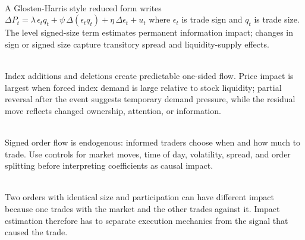 \begin{model} \\
A Glosten-Harris style reduced form writes $\Delta P_t=\lambda\,\epsilon_t q_t+\psi\,\Delta(\epsilon_t q_t)+\eta\,\Delta\epsilon_t+u_t$ where $\epsilon_t$ is trade sign and $q_t$ is trade size. The level signed-size term estimates permanent information impact; changes in sign or signed size capture transitory spread and liquidity-supply effects.
\end{model}

\begin{empiricalfinding} \\
Index additions and deletions create predictable one-sided flow. Price impact is largest when forced index demand is large relative to stock liquidity; partial reversal after the event suggests temporary demand pressure, while the residual move reflects changed ownership, attention, or information.
\end{empiricalfinding}

\begin{caveat} \\
Signed order flow is endogenous: informed traders choose when and how much to trade. Use controls for market moves, time of day, volatility, spread, and order splitting before interpreting coefficients as causal impact.
\end{caveat}

\begin{caveat} \\
Two orders with identical size and participation can have different impact because one trades with the market and the other trades against it. Impact estimation therefore has to separate execution mechanics from the signal that caused the trade.
\end{caveat}

